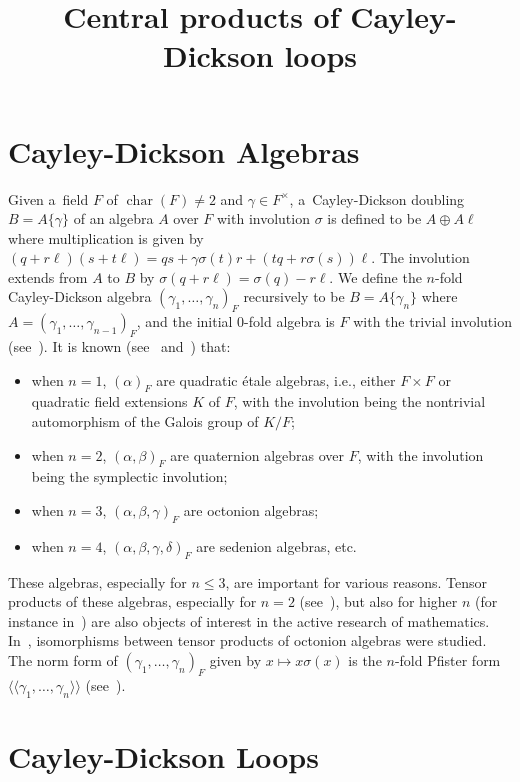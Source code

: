 \documentclass{jonasart}
\title{Central products of Cayley-Dickson loops}
\begin{document}
	\section{Cayley-Dickson Algebras}

	Given a~field $F$ of $\operatorname{char}(F)\neq 2$ and $\gamma \in F^\times$, a~Cayley-Dickson doubling $B=A\{\gamma\}$ of an algebra $A$ over $F$ with involution $\sigma$ is defined to be $A\oplus A\ell$ where multiplication is given by $(q+r\ell)(s+t\ell)=qs+\gamma\sigma(t)r+(tq+r\sigma(s))\ell$. The involution extends from $A$ to $B$ by $\sigma(q+r\ell)=\sigma(q)-r\ell$. We define the $n$-fold Cayley-Dickson algebra $(\gamma_1,\dots,\gamma_n )_F$ recursively to be $B=A\{\gamma_n\}$ where $A=(\gamma_1,\dots,\gamma_{n-1})_F$, and the initial 0-fold algebra is $F$ with the trivial involution (see~\cite{Schafer:1954}). It is known (see~\cite{Schafer:1954} and~\cite[Section 33.C]{BOI}) that:
	\begin{itemize}
		\item when $n=1$, $(\alpha)_F$ are quadratic \'etale algebras, i.e., either $F \times F$ or quadratic field extensions $K$ of $F$, with the involution being the nontrivial automorphism of the Galois group of $K/F$;
		\item when $n=2$, $(\alpha,\beta)_F$ are quaternion algebras over $F$, with the involution being the symplectic involution;
		\item when $n=3$, $(\alpha,\beta,\gamma)_F$ are octonion algebras;
		\item when $n=4$, $(\alpha,\beta,\gamma,\delta)_F$ are sedenion algebras, etc.
	\end{itemize}
	These algebras, especially for $n\leqslant 3$, are important for various reasons. Tensor products of these algebras, especially for $n=2$ (see~\cite{Merkurjev:1981}), but also for higher $n$ (for instance in~\cite{BlacharRowenVishne:2023}) are also objects of interest in the active research of mathematics. In~\cite{MPP}, isomorphisms between tensor products of octonion algebras were studied. The norm form of $(\gamma_1,\dots,\gamma_n )_F$ given by $x\mapsto x\sigma(x)$ is the $n$-fold Pfister form $\langle \! \langle \gamma_1,\dots,\gamma_n\rangle\!\rangle$ (see~\cite{Musgrave:2015}).

	\section{Cayley-Dickson Loops}
\end{document}
